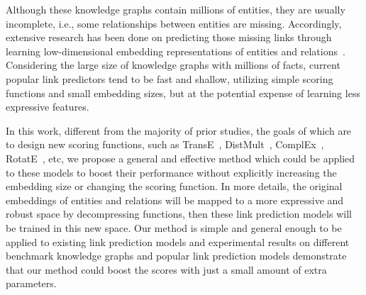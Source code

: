 \documentclass[letterpaper]{article} \usepackage{aaai20}  \usepackage{times}  \usepackage{helvet} \usepackage{courier}  \usepackage{booktabs}
\begin{document}
Although these knowledge graphs contain millions of entities, they are usually incomplete, i.e., some relationships between entities are missing. Accordingly, extensive research has been done on predicting those missing links through learning low-dimensional embedding representations of entities and relations~\cite{bordes2011learning,bordes2013translating,yang2014embedding,krompass2015type,nickel2015review,nguyen2016stranse,feng2016knowledge,trouillon2016complex,das2016chains,cai2017kbgan,xie2017interpretable,dettmers2018convolutional,lacroix2018canonical,ebisu2018toruse,schlichtkrull2018modeling,sun2019rotate}. Considering the large size of knowledge graphs with millions of facts, current popular link predictors tend to be fast and shallow, utilizing simple scoring functions and small embedding sizes, but at the potential expense of learning less expressive features. 




In this work, different from the majority of prior studies, the goals of which are to design new scoring functions, such as TransE~\cite{bordes2013translating}, DistMult~\cite{yang2014embedding}, ComplEx~\cite{trouillon2016complex}, RotatE~\cite{sun2019rotate}, etc, we  propose a general and effective method which could be applied to these models to boost their performance without explicitly increasing the embedding size or changing the scoring function. In more details, the original embeddings of entities and relations will be mapped to a more expressive and robust space by decompressing functions, then these link prediction models will be trained in this new space. Our method is simple and general enough to be applied to existing link prediction models and experimental results on different benchmark knowledge graphs and popular link prediction models demonstrate that our method could boost the scores with just a small amount of extra parameters.
\end{document}
